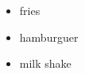 \documentclass{article}
\begin{document}
  \begin{itemize}
    \item{fries}
    \item{hamburguer}
    \item{milk shake}
  \end{itemize}
\end{document}

